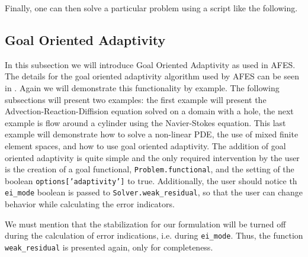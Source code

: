     Finally, one can then solve a particular problem using a script like the
    following.
    

\subsection{Goal Oriented Adaptivity} \label{sse:Adaptivity}

    In this subsection we will introduce Goal Oriented Adaptivity as used in
    AFES.  The details for the goal oriented adaptivity algorithm used by AFES
    can be seen in \cite{Foster2014e,Jansson2014a,Jansson2014b}. Again we will
    demonstrate this functionality by example. The following subsections will
    present two examples: the first example will present the
    Advection-Reaction-Diffision equation solved on a domain with a hole, the
    next example is flow around a cylinder using the Navier-Stokes equation.
    This last example will demonstrate how to solve a non-linear PDE, the use of
    mixed finite element spaces, and how to use goal oriented adaptivity.  The
    addition of goal oriented adaptivity is quite simple and the only required
    intervention by the user is the creation of a goal functional,
    \texttt{Problem.functional}, and the setting of the boolean
    \texttt{options['adaptivity']} to true.  Additionally, the user should
    notice th  \texttt{ei\_mode} boolean is passed to
    \texttt{Solver.weak\_residual}, so that the user can change behavior while
    calculating the error indicators.

    \begin{remark}
        We must mention that the stabilization for our formulation will be
        turned off during the calculation of error indications, i.e. during
        \texttt{ei\_mode}. Thus, the function \texttt{weak\_residual} is
        presented again, only for completeness.
    \end{remark}

